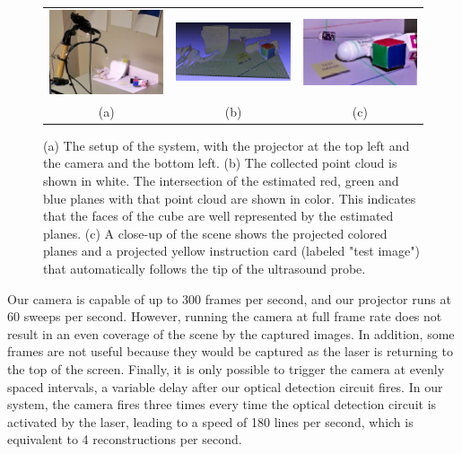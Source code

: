 \documentclass{llncs}
\begin{document}
\begin{figure}
\centering
\begin{tabular}{ccc}
\centering
\includegraphics[width=4cm,keepaspectratio]{Final-Setup} &
\includegraphics[width=4cm,keepaspectratio]{Final-Reconstruction} &
\includegraphics[width=4cm,keepaspectratio]{Final-CameraView}\\
(a) & (b) & (c)
\end{tabular}

\caption{
(a) The setup of the system, with the projector at the top left and the camera and the bottom left. (b) The collected point cloud is shown in white. The intersection of the estimated red, green and blue planes with that point cloud are shown in color. This indicates that the faces of the cube are well represented by the estimated planes. (c) A close-up of the scene shows the projected colored planes and a projected yellow instruction card (labeled "test image") that automatically follows the tip of the ultrasound probe.
}
\end{figure}

Our camera is capable of up to 300 frames per second, and our projector runs at 60 sweeps per second. However, running the camera at full frame rate does not result in an even coverage of the scene by the captured images. In addition, some frames are not useful because they would be captured as the laser is returning to the top of the screen. Finally, it is only possible to trigger the camera at evenly spaced intervals, a variable delay after our optical detection circuit fires. In our system, the camera fires three times every time the optical detection circuit is activated by the laser, leading to a speed of 180 lines per second, which is equivalent to 4 reconstructions per second.
\end{document}
